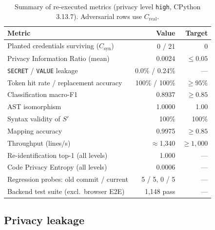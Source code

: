 \documentclass[conference]{IEEEtran}
\begin{document}
\begin{table}[!t]
\caption{Summary of re-executed metrics (privacy level \texttt{high},
CPython 3.13.7). Adversarial rows use $C_{\text{real}}$.}
\label{tab:summary}
\centering
\renewcommand{\arraystretch}{1.15}
\begin{tabular}{@{}lrr@{}}
\toprule
\textbf{Metric} & \textbf{Value} & \textbf{Target} \\
\midrule
Planted credentials surviving ($C_{\text{syn}}$)     & 0 / 21   & 0 \\
Privacy Information Ratio (mean)                      & 0.0024   & $\le 0.05$ \\
\;\; \texttt{SECRET} / \texttt{VALUE} leakage        & 0.0\% / 0.24\% & --- \\
Token hit rate / replacement accuracy                & 100\% / 100\% & $\ge 95\%$ \\
Classification macro-F1                               & 0.8937   & $\ge 0.85$ \\
AST isomorphism                                       & 1.0000   & 1.00 \\
Syntax validity of $S'$                               & 100\%    & 100\% \\
Mapping accuracy                                      & 0.9975   & $\ge 0.85$ \\
Throughput (lines/s)                                  & $\approx$1{,}340 & $\ge 1{,}000$ \\
Re-identification top-1 (all levels)                  & 1.000    & --- \\
Code Privacy Entropy (all levels)                     & 0.0006   & --- \\
Regression probes: old commit / current              & 5 / 5, 0 / 5 & --- \\
Backend test suite (excl.\ browser E2E)               & 1{,}148 pass & --- \\
\bottomrule
\end{tabular}
\end{table}

\subsection{Privacy leakage}
\end{document}
